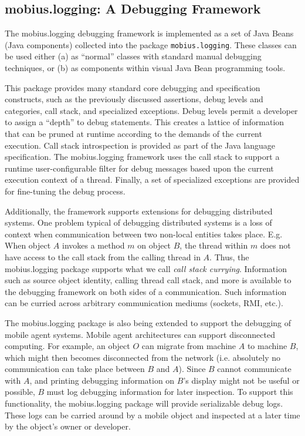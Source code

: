 \documentclass{article}
\begin{document}
\subsection{mobius.logging: A Debugging Framework}

The mobius.logging debugging framework is implemented as a set of Java Beans (Java
components) collected into the package \texttt{mobius.logging}.  These classes can
be used either (a) as ``normal'' classes with standard manual debugging
techniques, or (b) as components within visual Java Bean programming tools.

This package provides many standard core debugging and specification
constructs, such as the previously discussed assertions, debug levels
and categories, call stack, and specialized exceptions.  Debug levels
permit a developer to assign a ``depth'' to debug statements.  This
creates a lattice of information that can be pruned at runtime
according to the demands of the current execution.  Call stack
introspection is provided as part of the Java language specification.
The mobius.logging framework uses the call stack to support a runtime
user-configurable filter for debug messages based upon the current
execution context of a thread.  Finally, a set of specialized
exceptions are provided for fine-tuning the debug process.

Additionally, the framework supports extensions for debugging
distributed systems.  One problem typical of debugging distributed
systems is a loss of context when communication between two non-local
entities takes place.  E.g. When object $A$ invokes a method $m$ on
object $B$, the thread within $m$ does not have access to the call
stack from the calling thread in $A$.  Thus, the mobius.logging package
supports what we call \emph{call stack currying}.  Information such as
source object identity, calling thread call stack, and more is
available to the debugging framework on both sides of a communication.
Such information can be curried across arbitrary communication mediums
(sockets, RMI, etc.).

The mobius.logging package is also being extended to support the debugging of
mobile agent systems.  Mobile agent architectures can support
disconnected computing.  For example, an object $O$ can migrate from
machine $A$ to machine $B$, which might then becomes disconnected from
the network (i.e.  absolutely no communication can take place between
$B$ and $A$).  Since $B$ cannot communicate with $A$, and printing
debugging information on $B$'s display might not be useful or
possible, $B$ must log debugging information for later inspection.  To
support this functionality, the mobius.logging package will provide
serializable debug logs.  These logs can be carried around by a mobile
object and inspected at a later time by the object's owner or
developer.
\end{document}
